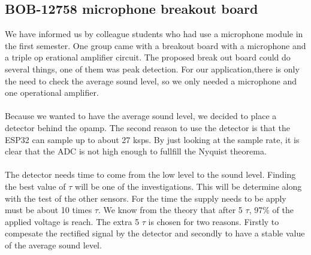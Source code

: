 \documentclass[11pt,a4paper]{article}
\begin{document}
\subsection{BOB-12758 microphone breakout board}
We have informed us by colleague students who had  use a microphone module in the first semester. One group came with a breakout board with a microphone and a triple op erational amplifier circuit. The proposed break out board could do several things, one of them was peak detection. For our application,there is only the need to check the average sound level, so we only needed a microphone and one operational amplifier. 
\\ \\
Because we wanted to have the average sound level, we decided to place a detector behind the opamp. The second reason to use the detector is that the ESP32 can sample up to about 27 ksps. By just looking at the sample rate, it is clear that the ADC is not high enough to fullfill the Nyquist theorema. 
\\ \\
The detector needs time to come from the low level to the sound level. Finding the best value of $\tau$ will be one of the investigations. This will be determine along with the test of the other sensors. For the time the supply needs to be apply must be about 10 times $\tau$. We know from the theory that after 5 $\tau$, 97\% of the applied voltage is reach. The extra 5 $\tau$ is chosen for two reasons. Firstly to compesate the rectified signal by the detector and secondly to have a stable value of the average sound level.
\end{document}

